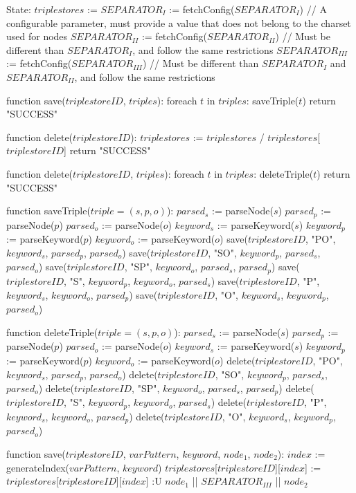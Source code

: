 State:
    $triplestores$ := {}
    $SEPARATOR_{I}$ := fetchConfig($SEPARATOR_{I}$) // A configurable parameter, must provide a value that does not belong to the charset used for nodes
    $SEPARATOR_{II}$ := fetchConfig($SEPARATOR_{II}$) // Must be different than $SEPARATOR_{I}$, and follow the same restrictions
    $SEPARATOR_{III}$ := fetchConfig($SEPARATOR_{III}$) // Must be different than $SEPARATOR_{I}$ and $SEPARATOR_{II}$, and follow the same restrictions

function save($triplestoreID$, $triples$):
    foreach $t$ in $triples$:
        saveTriple($t$)
    return "SUCCESS"

function delete($triplestoreID$):
    $triplestores$ := $triplestores$ / { $triplestores$[$triplestoreID$] }
    return "SUCCESS"

function delete($triplestoreID$, $triples$):
    foreach $t$ in $triples$:
        deleteTriple($t$)
    return "SUCCESS"

function saveTriple($triple = (s, p, o)$):
    $parsed_s$ := parseNode($s$)
    $parsed_p$ := parseNode($p$)
    $parsed_o$ := parseNode($o$)
    $keyword_s$ := parseKeyword($s$)
    $keyword_p$ := parseKeyword($p$)
    $keyword_o$ := parseKeyword($o$)
    save($triplestoreID$, "PO", $keyword_s$, $parsed_p$, $parsed_o$)
    save($triplestoreID$, "SO", $keyword_p$, $parsed_s$, $parsed_o$)
    save($triplestoreID$, "SP", $keyword_o$, $parsed_s$, $parsed_p$)
    save($triplestoreID$, "S", $keyword_p$, $keyword_o$, $parsed_s$)
    save($triplestoreID$, "P", $keyword_s$, $keyword_o$, $parsed_p$)
    save($triplestoreID$, "O", $keyword_s$, $keyword_p$, $parsed_o$)

function deleteTriple($triple = (s, p, o)$):
    $parsed_s$ := parseNode($s$)
    $parsed_p$ := parseNode($p$)
    $parsed_o$ := parseNode($o$)
    $keyword_s$ := parseKeyword($s$)
    $keyword_p$ := parseKeyword($p$)
    $keyword_o$ := parseKeyword($o$)
    delete($triplestoreID$, "PO", $keyword_s$, $parsed_p$, $parsed_o$)
    delete($triplestoreID$, "SO", $keyword_p$, $parsed_s$, $parsed_o$)
    delete($triplestoreID$, "SP", $keyword_o$, $parsed_s$, $parsed_p$)
    delete($triplestoreID$, "S", $keyword_p$, $keyword_o$, $parsed_s$)
    delete($triplestoreID$, "P", $keyword_s$, $keyword_o$, $parsed_p$)
    delete($triplestoreID$, "O", $keyword_s$, $keyword_p$, $parsed_o$)

function save($triplestoreID$, $varPattern$, $keyword$, $node_1$, $node_2$):
    $index$ := generateIndex($varPattern$, $keyword$)
    $triplestores$[$triplestoreID$][$index$] := $triplestores$[$triplestoreID$][$index$] :U { $node_1$ || $SEPARATOR_{III}$ || $node_2$ }

